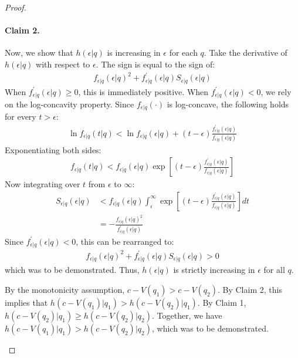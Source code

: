 \begin{proof}
\begin{enumerate}[label=(\roman*)]
\paragraph{Claim 2.} Now, we show that $h(\epsilon|q)$ is increasing in $\epsilon$ for each $q$. Take the derivative of $h(\epsilon|q)$ with respect to $\epsilon$. The sign is equal to the sign of:
\begin{align*}
f_{\epsilon|q}(\epsilon|q)^2 + f^\prime_{\epsilon|q}(\epsilon|q) S_{\epsilon|q}(\epsilon|q)
\end{align*}
When $f^\prime_{\epsilon|q}(\epsilon|q) \geq 0$, this is immediately positive. When $f_{\epsilon|q}^\prime(\epsilon|q)<0$, we rely on the log-concavity property. Since $f_{\epsilon|q}(\cdot)$ is log-concave, the following holds for every $t > \epsilon$:
\begin{align*}
\ln f_{\epsilon|q} (t|q) < \ln f_{\epsilon|q}(\epsilon|q) + (t-\epsilon) \frac{f_{\epsilon|q}^\prime(\epsilon|q)}{f_{\epsilon|q}(\epsilon|q)}
\end{align*}
Exponentiating both sides:
\begin{align*}
f_{\epsilon|q} (t|q) < f_{\epsilon|q}(\epsilon|q) \exp\left[ (t-\epsilon) \frac{f_{\epsilon|q}^\prime(\epsilon|q)}{f_{\epsilon|q}(\epsilon|q)} \right]
\end{align*}
Now integrating over $t$ from $\epsilon$ to $\infty$:
\begin{align*}
S_{\epsilon|q} (\epsilon | q) &< f_{\epsilon|q}(\epsilon|q) \int_{\epsilon}^\infty \exp\left[ (t-\epsilon) \frac{f_{\epsilon|q}^\prime(\epsilon|q)}{f_{\epsilon|q}(\epsilon|q)} \right] dt \\
& = - \frac{f_{\epsilon|q}(\epsilon|q)^2}{f^\prime_{\epsilon|q}(\epsilon|q)}
\end{align*}
Since $f^\prime_{\epsilon|q}(\epsilon|q) < 0$, this can be rearranged to:
\begin{align*}
f_{\epsilon|q}(\epsilon|q)^2 + f^\prime_{\epsilon|q}(\epsilon|q) S_{\epsilon|q}(\epsilon|q) > 0
\end{align*}
which was to be demonstrated. Thus, $h(\epsilon|q)$ is strictly increasing in $\epsilon$ for all $q$.

By the monotonicity assumption, $c - V(q_1) > c - V(q_2)$. By Claim 2, this implies that $h(c - V(q_1)|q_1) > h(c-V(q_2)|q_1)$. By Claim 1, $h(c-V(q_2) | q_1) \geq h(c-V(q_2) | q_2)$. Together, we have $h(c - V(q_1)|q_1) > h(c-V(q_2)|q_2)$, which was to be demonstrated. 
\end{enumerate}
\end{proof}



